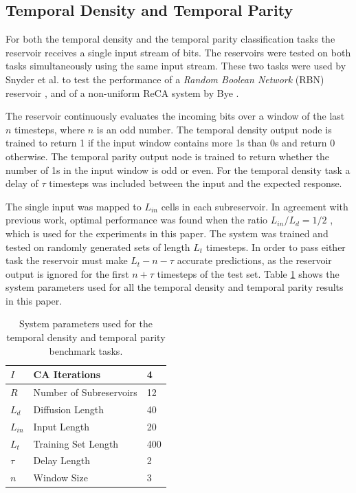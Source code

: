 \documentclass{elsarticle}
\begin{document}
\begin{multicols}{2}
\subsection{Temporal Density and Temporal Parity}
For both the temporal density and the temporal parity classification tasks the 
    reservoir receives a single input stream of bits. The reservoirs were 
    tested on both tasks simultaneously using the same input stream. These two 
    tasks were used by Snyder et al. to test the performance of a 
    \textit{Random Boolean Network} (RBN) reservoir 
    \cite{snyder2013computational}, and of a non-uniform ReCA system by Bye 
    \cite{bye2016investigation}. \par The reservoir continuously evaluates the 
    incoming bits over a window of the last $n$ timesteps, where $n$ is an odd 
    number. The temporal density output node is trained to return 1 if the 
    input window contains more 1s than 0s and return 0 otherwise. The temporal 
    parity output node is trained to return whether the number of 1s in the 
    input window is odd or even. For the temporal density task a delay of 
    $\tau$ timesteps was included between the input and the expected response.  
    \par The single input was mapped to $L_{in}$ cells in each subreservoir. In 
    agreement with previous work, optimal performance was found when the ratio 
    $L_{in}/L_{d} = 1/2$ \cite{bye2016investigation}, which is used for the 
    experiments in this paper. The system was trained and tested on randomly 
    generated sets of length $L_{t}$ timesteps.  In order to pass either task 
    the reservoir must make $L_{t} - n - \tau$ accurate predictions, as the 
    reservoir output is ignored for the first $n + \tau$ timesteps of the test 
    set.  Table \ref{table:temp_settings} shows the system parameters used for 
    all the temporal density and temporal parity results in this paper. 


\begin{table}[H] \centering
\begin{tabular}{|l|l|l|}
\hline
\textbf{$I$} & CA Iterations &  4 \\ \hline
\textbf{$R$} &  Number of Subreservoirs & 12  \\ \hline
\textbf{$L_{d}$} & Diffusion Length & 40 \\ \hline 
\textbf{$L_{in}$} & Input Length & 20 \\ \hline
\textbf{$L_{t}$} & Training Set Length & 400 \\ \hline
\textbf{$\tau$} & Delay Length & 2 \\ \hline
\textbf{$n$} & Window Size &  3 \\ \hline
\end{tabular}
\caption{System parameters used for the temporal density and temporal parity 
   benchmark tasks.}
\label{table:temp_settings}
\end{table}




\end{multicols}
\end{document}
